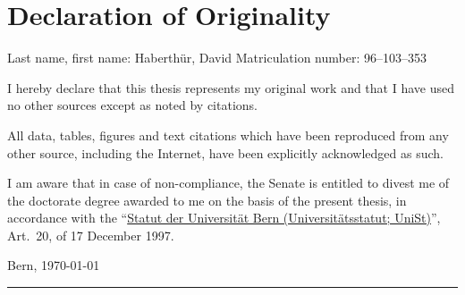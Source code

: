 \pagestyle{empty}
\hfill
\vfill
\section*{Declaration of Originality}
\noindent Last name, first name: Haberthür, David\bigskip
\noindent Matriculation number: 96--103--353\bigskip

I hereby declare that this thesis represents my original work and that I have used no other sources except as noted by citations.

All data, tables, figures and text citations which have been reproduced from any other source, including the Internet, have been explicitly acknowledged as such.

I am aware that in case of non-compliance, the Senate is entitled to divest me of the doctorate degree awarded to me on the basis of the present thesis, in accordance with the
``\href{http://www.sta.be.ch/belex/d/4/436_111_2.html}{Statut der Universität Bern (Universitätsstatut; UniSt)}'', Art.\ 20, of 17 December 1997.\bigskip
 
\noindent Bern, \today \hfill \rule{0.5\linewidth}{0.01em}
